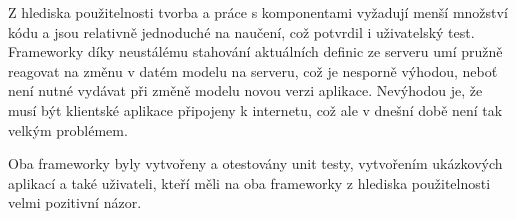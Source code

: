 Z hlediska použitelnosti tvorba a práce s komponentami vyžadují menší množství kódu a jsou relativně jednoduché na naučení, což potvrdil i uživatelský test. Frameworky díky neustálému stahování aktuálních definic ze serveru umí pružně reagovat na změnu v datém modelu na serveru, což je nesporně výhodou, neboť není nutné vydávat při změně modelu novou verzi aplikace. Nevýhodou je, že musí být klientské aplikace připojeny k internetu, což ale v dnešní době není tak velkým problémem. 

Oba frameworky byly vytvořeny a otestovány unit testy, vytvořením ukázkových aplikací a také uživateli, kteří měli na oba frameworky z hlediska použitelnosti velmi pozitivní názor.